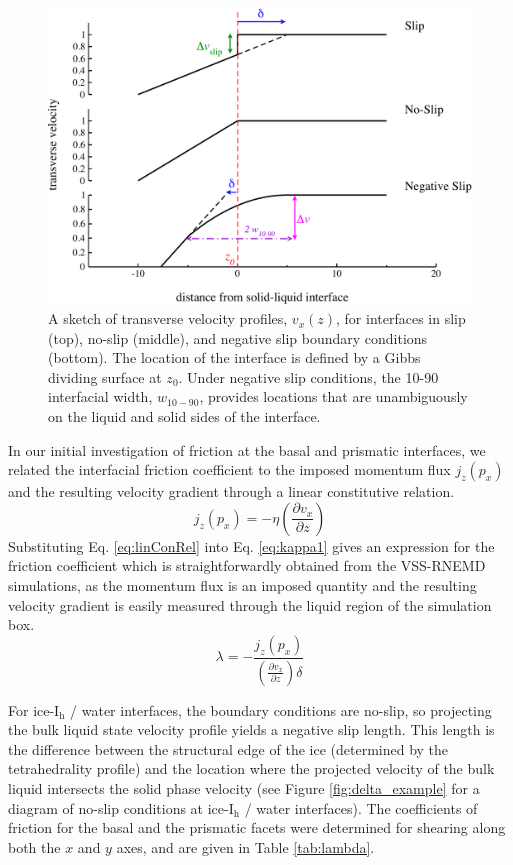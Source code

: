 \begin{figure}
\includegraphics[width=\linewidth]{Figures/slipLengthPlot}
\caption{\label{fig:slipLength} A sketch of transverse velocity
  profiles, $v_x(z)$, for interfaces in slip (top), no-slip (middle),
  and negative slip boundary conditions (bottom).  The location of the
  interface is defined by a Gibbs dividing surface at $z_0$. Under
  negative slip conditions, the 10-90 interfacial width, $w_{10-90}$,
  provides locations that are unambiguously on the liquid and solid
  sides of the interface.\label{fig:slipLengthPlot}}
\end{figure}


In our initial investigation of friction at the basal and prismatic
interfaces, we related the interfacial friction coefficient to the
imposed momentum flux $j_z(p_x)$ and the resulting velocity gradient
through a linear constitutive relation.
\begin{equation}\label{eq:linConRel}
j_{z}(p_{x})=-\eta \left(\frac{\partial v_{x}}{\partial z}\right)
\end{equation}
Substituting Eq. \eqref{eq:linConRel} into Eq. \eqref{eq:kappa1} gives
an expression for the friction coefficient which is straightforwardly
obtained from the VSS-RNEMD simulations, as the momentum flux is an
imposed quantity and the resulting velocity gradient is easily
measured through the liquid region of the simulation box.
\begin{equation}
\lambda=-\frac{j_{z}(p_{x})} {\left(\frac{\partial v_{x}}{\partial
      z}\right) \delta}
\end{equation}

For ice-I$_\mathrm{h}$ / water interfaces, the boundary conditions are
no-slip, so projecting the bulk liquid state velocity profile yields a
negative slip length. This length is the difference between the
structural edge of the ice (determined by the tetrahedrality profile)
and the location where the projected velocity of the bulk liquid
intersects the solid phase velocity (see Figure
\ref{fig:delta_example} for a diagram of no-slip conditions at
ice-I$_\mathrm{h}$ / water interfaces). The coefficients of friction
for the basal and the prismatic facets were determined for shearing
along both the $x$ and $y$ axes, and are given in Table
\ref{tab:lambda}.

